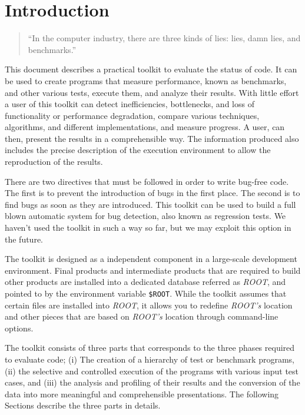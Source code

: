 
\section{Introduction}
\begin{verse}
``In the computer industry, there are three kinds of lies: lies, damn lies, and
 benchmarks.''
\end{verse}
This document describes a practical toolkit to evaluate the status of code. 
It can be used to create programs that measure performance, known as 
benchmarks, and other various tests, execute them, and analyze their results. 
With little effort a user of this toolkit can detect inefficiencies, 
bottlenecks, and loss of functionality or performance degradation, compare 
various techniques, algorithms, and different implementations, and measure 
progress. A user, can then, present the results in a comprehensible way. The 
information produced also includes the precise description of the execution 
environment to allow the reproduction of the results.

There are two directives that must be followed in order to write bug-free code.
The first is to prevent the introduction of bugs in the first place. The second
is to find bugs as soon as they are introduced. This toolkit can be used to
build a full blown automatic system for bug detection, also known as regression
tests. We haven't used the toolkit in such a way so far, but we may exploit
this option in the future.

The toolkit is designed as a independent component in a large-scale
development environment. Final products and intermediate products that
are required to build other products are installed into a dedicated
database referred as {\em ROOT}, and pointed to by the environment
variable {\tt \$ROOT}. While the toolkit assumes that certain files are
installed into {\em ROOT}, it allows you to redefine {\em ROOT's}
location and other pieces that are based on {\em ROOT's} location
through command-line options.

The toolkit consists of three parts that corresponds to the three phases
required to evaluate code; (i) The creation of a hierarchy of test or benchmark
programs, (ii) the selective and controlled execution of the programs with
various input test cases, and (iii) the analysis and profiling of their results
and the conversion of the data into more meaningful and comprehensible
presentations. The following Sections describe the three parts in details.

